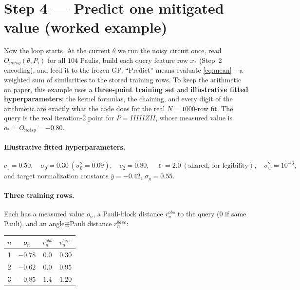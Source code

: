\documentclass[11pt]{article}
\def\bm#1{#1}%
\def\texttt#1{#1}%
\def\mathrm#1{#1}%
\begin{document}
\section{Step 4 --- Predict one mitigated value (worked example)}
\label{sec:worked-gp}

Now the loop starts. At the current $\bm\theta$ we run the noisy circuit once,
read $O_{\mathrm{noisy}}(\bm\theta,P_i)$ for all $104$ Paulis, build each query
feature row $\bm x_*$ (Step~2 encoding), and feed it to the frozen GP. ``Predict''
means evaluate \eqref{eq:mean} -- a weighted sum of similarities to the stored
training rows. To keep the arithmetic on paper, this
example uses a \textbf{three-point training set} and \textbf{illustrative fitted
hyperparameters}; the kernel formulas, the chaining, and every digit of the
arithmetic are exactly what the code does for the real $N{=}1000$-row fit. The
query is the real iteration-2 point for $P=\texttt{IIIIIZII}$, whose measured
value is $o_*=O_{\mathrm{noisy}}=-0.80$.

\paragraph{Illustrative fitted hyperparameters.}
\[
c_1=0.50,\quad \sigma_0=0.30\ (\sigma_0^2=0.09),\quad c_2=0.80,\quad
\ell=2.0\ (\text{shared, for legibility}),\quad \sigma_w^2=10^{-3},
\]
and target normalization constants $\bar y=-0.42$, $\sigma_y=0.55$.

\paragraph{Three training rows.} Each has a measured value $o_n$, a Pauli-block
distance $r^{\mathrm{obs}}_n$ to the query (0 if same Pauli), and an
angle$\oplus$Pauli distance $r^{\mathrm{base}}_n$:
\begin{center}
\renewcommand{\arraystretch}{1.2}
\begin{tabular}{@{}cccc@{}}
\toprule
$n$ & $o_n$ & $r^{\mathrm{obs}}_n$ & $r^{\mathrm{base}}_n$ \\
\midrule
1 & $-0.78$ & $0.0$ & $0.30$ \\
2 & $-0.62$ & $0.0$ & $0.95$ \\
3 & $-0.85$ & $1.4$ & $1.20$ \\
\bottomrule
\end{tabular}
\end{center}
\end{document}
